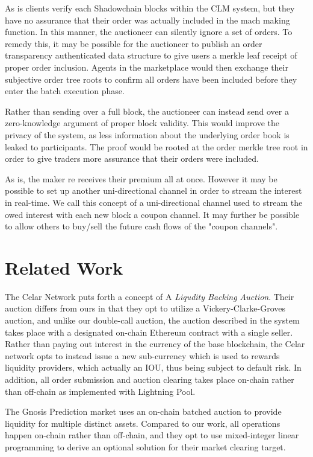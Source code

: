 \documentclass[10pt,a4paper]{article}
\theoremstyle{definition}
\begin{document}
As is clients verify each Shadowchain blocks within the CLM system, but they
have no assurance that their order was actually included in the mach making
function. In this manner, the auctioneer can silently ignore a set of orders.
To remedy this, it may be possible for the auctioneer to publish an order
transparency authenticated data structure to give users a merkle leaf receipt of proper
order inclusion. Agents in the marketplace would then exchange their subjective
order tree roots to confirm all orders have been included before they enter the
batch execution phase.

Rather than sending over a full block, the auctioneer can instead send over a
zero-knowledge argument of proper block validity. This would improve the privacy of the
system, as less information about the underlying order book is leaked to
participants. The proof would be rooted at the order merkle tree root in order
to give traders more assurance that their orders were included.

As is, the maker re receives their premium all at once. However it may be
possible to set up another uni-directional channel in order to stream the
interest in real-time. We call this concept of a uni-directional channel used
to stream the owed interest with each new block a coupon channel. It may
further be possible to allow others to buy/sell the future cash flows of the
"coupon channels".

\section{Related Work}

The Celar Network \cite{celarnet} puts forth a concept of A \emph{Liqudity
Backing Auction}. Their auction differs from ours in that they opt to utilize a
Vickery-Clarke-Groves auction, and unlike our double-call auction, the auction
described in the system takes place with a designated on-chain Ethereum
contract with a single seller. Rather than paying out interest in the currency
of the base blockchain, the Celar network opts to instead issue a new
sub-currency which is used to rewards liquidity providers, which actually an
IOU, thus being subject to default risk. In addition, all order submission and
auction clearing takes place on-chain rather than off-chain as implemented with
Lightning Pool. 

The Gnosis Prediction \cite{gnosis} market uses an on-chain batched auction to
provide liquidity for multiple distinct assets. Compared to our work, all
operations happen on-chain rather than off-chain, and they opt to use
mixed-integer linear programming to derive an optional solution for their
market clearing target.
\end{document}
